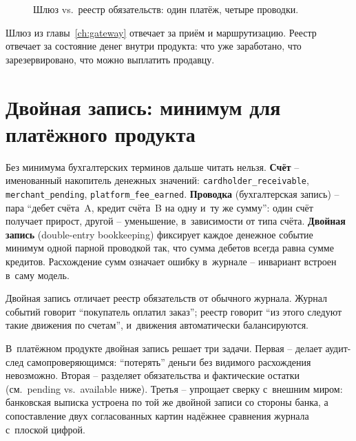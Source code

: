 \begin{figure}[tbp]
  \centering
  \caption{Шлюз vs.\ реестр обязательств: один платёж, четыре проводки.}\label{fig:gateway-vs-ledger}
\end{figure}


Шлюз из главы~\ref{ch:gateway} отвечает за приём и маршрутизацию.
Реестр отвечает за состояние денег внутри продукта: что уже
заработано, что зарезервировано, что можно выплатить продавцу.

\section{Двойная запись: минимум для платёжного продукта}\label{sec:ledger-double-entry}

Без минимума бухгалтерских терминов дальше читать нельзя.
\textbf{Счёт} -- именованный накопитель денежных значений:
\texttt{cardholder\_receivable}, \texttt{merchant\_pending},
\texttt{platform\_fee\_earned}. \textbf{Проводка} (бухгалтерская
запись) -- пара \enquote{дебет счёта~A, кредит счёта~B на одну
и~ту же сумму}: один счёт получает прирост, другой -- уменьшение,
в~зависимости от типа счёта. \textbf{Двойная запись} (double-entry
bookkeeping) фиксирует каждое денежное событие минимум одной
парной проводкой так, что сумма дебетов всегда равна сумме
кредитов. Расхождение сумм означает ошибку в~журнале -- инвариант
встроен в~саму модель.

Двойная запись отличает реестр обязательств от обычного журнала.
Журнал событий говорит \enquote{покупатель оплатил заказ}; реестр
говорит \enquote{из этого следуют такие движения по счетам},
и~движения автоматически балансируются.

В~платёжном продукте двойная запись решает три задачи. Первая --
делает аудит-след самопроверяющимся: \enquote{потерять} деньги
без видимого расхождения невозможно. Вторая -- разделяет
обязательства и фактические остатки (см.\ pending vs.\ available
ниже). Третья -- упрощает сверку с~внешним миром: банковская
выписка устроена по той же двойной записи со стороны банка,
а сопоставление двух согласованных картин надёжнее сравнения
журнала с~плоской цифрой.

